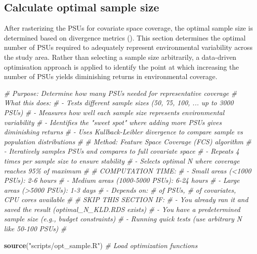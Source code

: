 \documentclass[
  10pt,
  b5paper,
  oneside]{book}
\newenvironment{Shaded}{\begin{snugshade}}{\end{snugshade}}
\newcommand{\CommentTok}[1]{\textcolor[rgb]{0.56,0.35,0.01}{\textit{#1}}}
\newcommand{\FunctionTok}[1]{\textcolor[rgb]{0.13,0.29,0.53}{\textbf{#1}}}
\newcommand{\NormalTok}[1]{#1}
\newcommand{\StringTok}[1]{\textcolor[rgb]{0.31,0.60,0.02}{#1}}
\begin{document}
\subsection{Calculate optimal sample size}\label{sec-optimal-sample-size}

After rasterizing the PSUs for covariate space coverage, the optimal sample size is determined based on divergence metrics (). This section determines the optimal number of PSUs required to adequately represent environmental variability across the study area. Rather than selecting a sample size arbitrarily, a data-driven optimisation approach is applied to identify the point at which increasing the number of PSUs yields diminishing returns in environmental coverage.

\begin{Shaded}
\begin{Highlighting}[]
\CommentTok{\# Purpose: Determine how many PSUs needed for representative coverage}
\CommentTok{\# What this does:}
\CommentTok{\#  {-} Tests different sample sizes (50, 75, 100, ... up to 3000 PSUs)}
\CommentTok{\#  {-} Measures how well each sample size represents environmental variability}
\CommentTok{\#  {-} Identifies the "sweet spot" where adding more PSUs gives diminishing returns}
\CommentTok{\#  {-} Uses Kullback{-}Leibler divergence to compare sample vs population distributions}
\CommentTok{\#}
\CommentTok{\# Method: Feature Space Coverage (FCS) algorithm}
\CommentTok{\#  {-} Iteratively samples PSUs and compares to full covariate space}
\CommentTok{\#  {-} Repeats 4 times per sample size to ensure stability}
\CommentTok{\#  {-} Selects optimal N where coverage reaches 95\% of maximum}
\CommentTok{\#}
\CommentTok{\# COMPUTATION TIME: }
\CommentTok{\#  {-} Small areas (\textless{}1000 PSUs): 2{-}6 hours}
\CommentTok{\#  {-} Medium areas (1000{-}5000 PSUs): 6{-}24 hours  }
\CommentTok{\#  {-} Large areas (\textgreater{}5000 PSUs): 1{-}3 days}
\CommentTok{\#  {-} Depends on: \# of PSUs, \# of covariates, CPU cores available}
\CommentTok{\#}
\CommentTok{\# SKIP THIS SECTION IF:}
\CommentTok{\#  {-} You already ran it and saved the result (optimal\_N\_KLD.RDS exists)}
\CommentTok{\#  {-} You have a predetermined sample size (e.g., budget constraints)}
\CommentTok{\#  {-} Running quick tests (use arbitrary N like 50{-}100 PSUs)}
\CommentTok{\#}

\FunctionTok{source}\NormalTok{(}\StringTok{"scripts/opt\_sample.R"}\NormalTok{)  }\CommentTok{\# Load optimization functions}


\end{Highlighting}
\end{Shaded}
\end{document}
